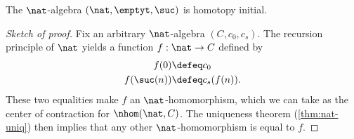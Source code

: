 %
\begin{thm}\label{thm:nat-hinitial}
The $\nat$-algebra $(\nat, \emptyt, \suc)$ is homotopy initial.
\end{thm}

\begin{proof}[Sketch of proof]
  Fix an arbitrary $\nat$-algebra $(C,c_0,c_s)$.
  The recursion principle of $\nat$ yields a function $f:\nat\to C$ defined by
  \begin{align*}
    f(0) &\defeq c_0\\
    f(\suc(n)) &\defeq c_s(f(n)).
  \end{align*}
  These two equalities make $f$ an $\nat$-homomorphism, which we can take as the center of contraction for $\nhom(\nat,C)$.
  The uniqueness theorem (\cref{thm:nat-uniq}) then implies that any other $\nat$-homomorphism is equal to $f$.
\end{proof}
